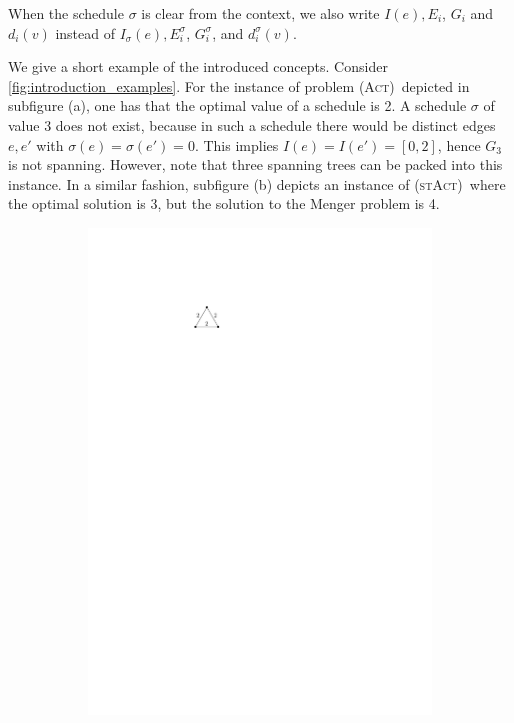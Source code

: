 \documentclass[10pt,a4paper]{article}
\numberwithin{equation}{section}
\newcommand{\act}{\textsc{(Act)}}
\newcommand{\stact}{\textsc{(stAct)}}
\begin{document}
When the schedule $\sigma$ is clear from the context, we also write $I(e), E_i$, $G_i$ and $d_i(v)$ instead of $I_\sigma(e), E^\sigma_i$, $G^\sigma_i$, and $d^\sigma_i(v)$. 

We give a short example of the introduced concepts. Consider \cref{fig:introduction_examples}. For the instance of problem \act\ depicted in subfigure (a), one has that the optimal value of a schedule is 2. A schedule $\sigma$ of value 3 does not exist, because in such a schedule there would be distinct edges $e, e'$ with $\sigma(e) = \sigma(e') = 0$. This implies $I(e) = I(e') = [0, 2]$, hence $G_3$ is not spanning. However, note that three spanning trees can be packed into this instance. In a similar fashion, subfigure (b) depicts an instance of \stact\ where the optimal solution is 3, but the solution to the Menger problem is 4.
\begin{figure}
     \centering
     \begin{subfigure}[t]{0.3\textwidth}
         \centering
         \includegraphics[scale=1]{img/example-act}

\end{subfigure}
\end{figure}
\end{document}

